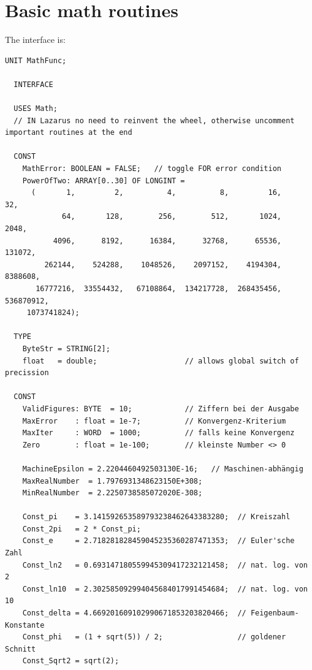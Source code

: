 \chapter{Basic math routines}
\begin{refsection}


The interface is:

\begin{lstlisting}[caption=Interface of unit MathFunc]
  UNIT MathFunc;

  INTERFACE

  USES Math;
  // IN Lazarus no need to reinvent the wheel, otherwise uncomment important routines at the end

  CONST
    MathError: BOOLEAN = FALSE;   // toggle FOR error condition
    PowerOfTwo: ARRAY[0..30] OF LONGINT =
      (       1,         2,          4,          8,         16,         32,
             64,       128,        256,        512,       1024,       2048,
           4096,      8192,      16384,      32768,      65536,     131072,
         262144,    524288,    1048526,    2097152,    4194304,    8388608,
       16777216,  33554432,   67108864,  134217728,  268435456,  536870912,
     1073741824);

  TYPE
    ByteStr = STRING[2];
    float   = double;                    // allows global switch of precission

  CONST
    ValidFigures: BYTE  = 10;            // Ziffern bei der Ausgabe
    MaxError    : float = 1e-7;          // Konvergenz-Kriterium
    MaxIter     : WORD  = 1000;          // falls keine Konvergenz
    Zero        : float = 1e-100;        // kleinste Number <> 0

    MachineEpsilon = 2.2204460492503130E-16;   // Maschinen-abhängig
    MaxRealNumber  = 1.7976931348623150E+308;
    MinRealNumber  = 2.2250738585072020E-308;

    Const_pi    = 3.141592653589793238462643383280;  // Kreiszahl
    Const_2pi   = 2 * Const_pi;
    Const_e     = 2.718281828459045235360287471353;  // Euler'sche Zahl
    Const_ln2   = 0.693147180559945309417232121458;  // nat. log. von 2
    Const_ln10  = 2.302585092994045684017991454684;  // nat. log. von 10
    Const_delta = 4.669201609102990671853203820466;  // Feigenbaum-Konstante
    Const_phi   = (1 + sqrt(5)) / 2;                 // goldener Schnitt
    Const_Sqrt2 = sqrt(2);



\end{lstlisting}
\end{refsection}
